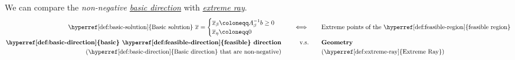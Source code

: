 \begin{remark}
	We can compare the \emph{non-negative \hyperref[def:basic-direction]{basic direction}} with \emph{\hyperref[def:extreme-ray]{extreme ray}}.
	\[
		\begin{alignedat}{4}
			\text{\hyperref[def:basic-solution]{Basic solution} }\overline{x}=\begin{cases}
				                                                                  \overline{x}_{\beta}\coloneqq A^{-1}_{\beta}b\geq 0 \\
				                                                                  \overline{x}_{\eta} \coloneqq 0
			                                                                  \end{cases}                             &  & \qquad\iff\qquad         & \text{Extreme points of the \hyperref[def:feasible-region]{feasible region}} \\
			\text{\textbf{\hyperref[def:basic-direction]{basic} \hyperref[def:feasible-direction]{feasible} direction}} &  & \qquad \text{v.s.}\qquad & \text{\textbf{Geometry}}                                                   \\
			\text{(\hyperref[def:basic-direction]{Basic direction} that are non-negative)}                              &  &                          & \text{(\hyperref[def:extreme-ray]{Extreme Ray})}
		\end{alignedat}
	\]
\end{remark}